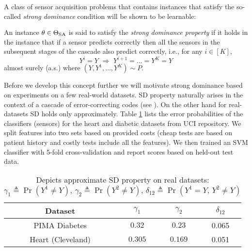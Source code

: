 A class of sensor acquisition problems that contains instances that satisfy the so-called \emph{strong dominance} condition 
will be shown to be learnable:
\begin{defi}
An instance $\theta \in \Theta_{\mathrm{SA}}$  is said to satisfy the \emph{strong dominance property} if 
it holds in the instance that if a sensor predicts correctly
then all the sensors in the subsequent stages of the cascade also predict correctly, i.e., 
for any $i\in [K]$,
    \begin{equation}
	\label{eqn:DominanceCondition}
	Y^i=Y \,\, \Rightarrow\,\, Y^{i+1}= \dots =  Y^K = Y
	\end{equation}
	almost surely (a.s.)
	where $(Y,Y^1,\dots,Y^K)\sim P$.
\end{defi}
Before we develop this concept further we will motivate strong dominance based on experiments on a few real-world datasets. SD property naturally arises in the context of a cascade of error-correcting codes (see \cite{costello,voyager}). On the other hand for real-datasets SD holds only approximately. Table \ref{tab:ErrorTable1} lists the error probabilities of the classifiers (sensors) for the heart and diabetic datasets from UCI repository. We split features into two sets based on provided costs (cheap tests are based on patient history and costly tests include all the features). We then trained an SVM classifier with 5-fold cross-validation and report scores based on held-out test data. 
\begin{table}[h]
\vspace{-6pt}
\begin{center}
\begin{tabular}[c]{c|c|c|c } 
Dataset & $\gamma_1$ & $\gamma_2$ & $\delta_{12}$\\ \hline \hline
PIMA Diabetes & $0.32 $ & $ 0.23$  & 0.065\\  \hline
Heart (Cleveland) & $0.305$ & $0.169$ &  0.051\\  \hline
\end{tabular}
\label{tab:ErrorTable1}
\caption{\footnotesize Depicts approximate SD property on real datasets: $\gamma_1 \triangleq \Pr(Y^1 \neq Y),\,\gamma_2\triangleq \Pr(Y^2 \neq Y),\, \delta_{12} \triangleq \Pr(Y^1=Y,\, Y^2\neq Y)$ }
\end{center}
\vspace{-13pt}
\end{table}
